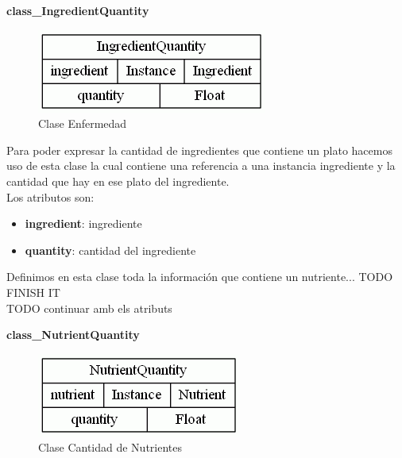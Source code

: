 \documentclass[12]{article}
\begin{document}
\vspace{0.5cm}

\textbf{class\_IngredientQuantity}
\begin{figure}[H]
\centering
\includegraphics[scale=0.5]{images/classIngredientQuantity.png}
\caption{Clase Enfermedad}
\label{cantidad_ingrediente}
\end{figure}

Para poder expresar la cantidad de ingredientes que contiene un plato hacemos uso de esta clase la cual contiene una referencia a una instancia ingrediente y la cantidad que hay en ese plato del ingrediente.
\\

Los atributos son: 
\begin{itemize}
\item \textbf{ingredient}: ingrediente
\item \textbf{quantity}: cantidad del ingrediente
\end{itemize}


\vspace{0.5cm}


Definimos en esta clase toda la información que contiene un nutriente... TODO FINISH IT 
\\
TODO continuar amb els atributs


\vspace{0.5cm}

\textbf{class\_NutrientQuantity}
\begin{figure}[H]
\centering
\includegraphics[scale=0.5]{images/classNutrientQuantity.png}
\caption{Clase Cantidad de Nutrientes}
\label{cantidad_nutriente}
\end{figure}
\end{document}
